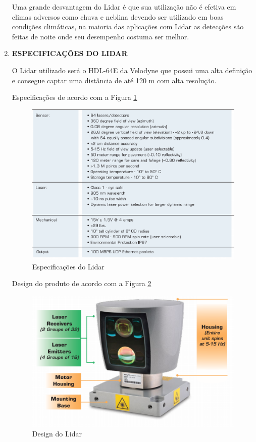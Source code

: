 \begin{enumerate}
	Uma grande desvantagem do Lidar é que sua utilização não é efetiva em
  climas adversos como chuva e neblina devendo ser utilizado em boas condições
  climáticas, na maioria das aplicações com Lidar as detecções são feitas
  de noite onde seu desempenho costuma ser melhor.

\item \textbf{ESPECIFICAÇÕES DO LIDAR}

O Lidar utilizado será o HDL-64E da Velodyne que possui uma alta definição e consegue captar uma distância de até 120 m com alta resolução.

Especificações de acordo com a Figura \ref{fig:especificacoes_lidar}

\begin{figure}[h]
  \centering
  \includegraphics[width=400px, scale=1]{figuras/especificacoes_lidar}
  \caption{Especificações do Lidar}
\label{fig:especificacoes_lidar}
\end{figure}

Design do produto de acordo com a Figura \ref{fig:design_lidar}

\begin{figure}[h]
  \centering
  \includegraphics[width=400px, scale=1]{figuras/design_lidar}
  \caption{Design do Lidar}
\label{fig:design_lidar}
\end{figure}
\end{enumerate}
